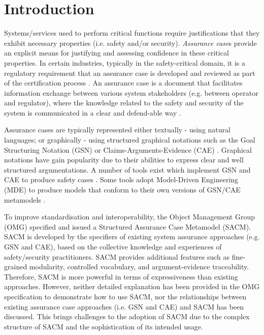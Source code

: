 \section{Introduction}
Systems/services used to perform critical functions require justifications that they exhibit necessary properties (i.e. safety and/or security). 
\textit{Assurance case}s provide an explicit means for justifying and assessing confidence in these critical properties. 
In certain industries, typically in the safety-critical domain, it is a regulatory requirement that an assurance case is developed and reviewed as part of the certification process \cite{healthFound}.
An assurance case is a document that facilitates information exchange between various system stakeholders (e.g. between operator and regulator), where the knowledge related to the safety and security of the system is communicated in a clear and defend-able way \cite{hawkins2013assurance}. 

Assurance cases are typically represented either textually - using natural languages; or graphically - using structured graphical notations such as the Goal Structuring Notation (GSN) \cite{kelly2004goal} or Claims-Arguments-Evidence (CAE) \cite{bishop2000methodology}. 
Graphical notations have gain popularity due to their abilities to express clear and well structured argumentations.
A number of tools exist which implement GSN and CAE to produce safety cases \cite{maksimov2018}. 
Some tools adopt Model-Driven Engineering (MDE) to produce models that conform to their own versions of GSN/CAE metamodels \cite{denney2017tool, matsuno2010dependability, netkachova2014tool, larrucea2017supporting, barry2011certware}.

To improve standardisation and interoperability, the Object Management Group (OMG) specified and issued a Structured Assurance Case Metamodel (SACM). 
SACM is developed by the specifiers of existing system assurance approaches (e.g. GSN and CAE), based on the collective knowledge and experiences of safety/security practitioners.
SACM provides additional features such as fine-grained modularity, controlled vocabulary, and argument-evidence traceability. 
Therefore, SACM is more powerful in terms of expressiveness than existing approaches. 
However, neither detailed explanation has been provided in the OMG specification to demonstrate how to use SACM, nor the relationships between existing assurance case approaches (i.e. GSN and CAE) and SACM has been discussed. 
This brings challenges to the adoption of SACM due to the complex structure of SACM and the sophistication of its intended usage. 

